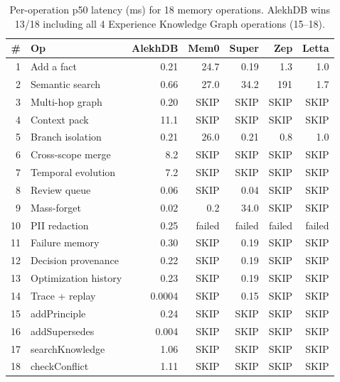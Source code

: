 \begin{table}[h]
\centering
\scriptsize
\begin{tabular}{rlrrrrr}
\toprule
\# & Op & AlekhDB & Mem0 & Super & Zep & Letta \\
\midrule
1 & Add a fact & 0.21 & 24.7 & 0.19 & 1.3 & 1.0 \\
2 & Semantic search & 0.66 & 27.0 & 34.2 & 191 & 1.7 \\
3 & Multi-hop graph & 0.20 & SKIP & SKIP & SKIP & SKIP \\
4 & Context pack & 11.1 & SKIP & SKIP & SKIP & SKIP \\
5 & Branch isolation & 0.21 & 26.0 & 0.21 & 0.8 & 1.0 \\
6 & Cross-scope merge & 8.2 & SKIP & SKIP & SKIP & SKIP \\
7 & Temporal evolution & 7.2 & SKIP & SKIP & SKIP & SKIP \\
8 & Review queue & 0.06 & SKIP & 0.04 & SKIP & SKIP \\
9 & Mass-forget & 0.02 & 0.2 & 34.0 & SKIP & SKIP \\
10 & PII redaction & 0.25 & failed & failed & failed & failed \\
11 & Failure memory & 0.30 & SKIP & 0.19 & SKIP & SKIP \\
12 & Decision provenance & 0.22 & SKIP & 0.19 & SKIP & SKIP \\
13 & Optimization history & 0.23 & SKIP & 0.19 & SKIP & SKIP \\
14 & Trace + replay & 0.0004 & SKIP & 0.15 & SKIP & SKIP \\
\midrule
15 & addPrinciple & 0.24 & SKIP & SKIP & SKIP & SKIP \\
16 & addSupersedes & 0.004 & SKIP & SKIP & SKIP & SKIP \\
17 & searchKnowledge & 1.06 & SKIP & SKIP & SKIP & SKIP \\
18 & checkConflict & 1.11 & SKIP & SKIP & SKIP & SKIP \\
\bottomrule
\end{tabular}
\caption{Per-operation p50 latency (ms) for 18 memory operations. AlekhDB wins 13/18 including all 4 Experience Knowledge Graph operations (15--18).}
\end{table}


